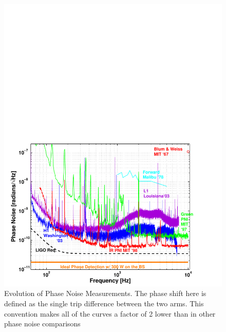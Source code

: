 \begin{figure}[!h]
\centerline{
\includegraphics[angle=0,width=6.5in]{Figures/Chap4/PhaseNoises.pdf}}
\caption[Phase Noise]{Evolution of Phase Noise Measurements. The phase shift
         here is defined as the single trip difference between the two arms.
         This convention makes all of the curves a factor of 2 lower than
         in other phase noise comparisons~\cite{Brian:Thesis,Fritschel:PNI}}
\label{fig:PhaseNoise}
\end{figure}


